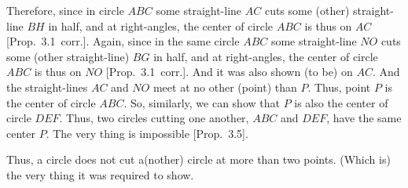 \begin{Parallel}{}{}
{\epsfysize=2.2in
\centerline{}

Therefore, since in circle $ABC$ some straight-line $AC$ cuts some (other)
straight-line $BH$ in half, and at right-angles, the center of circle $ABC$
is thus on $AC$ [Prop.~3.1~corr.]. Again, since in the same circle $ABC$
some straight-line $NO$ cuts some (other straight-line) $BG$ in half, and
at right-angles, the center of circle $ABC$ is thus on $NO$ [Prop.~3.1~corr.].
And it was also shown (to be) on $AC$. And the straight-lines $AC$ and $NO$
meet at no other (point) than $P$. Thus, point $P$ is the center of circle $ABC$.
So, similarly, we can show that $P$ is also the center of circle $DEF$.
Thus,  two circles cutting one another, $ABC$ and $DEF$, have the same center
$P$. The very thing is impossible [Prop.~3.5].

Thus, a circle does not cut a(nother) circle at more than two points. (Which is)
the very thing it was required to show.}
\end{Parallel}

